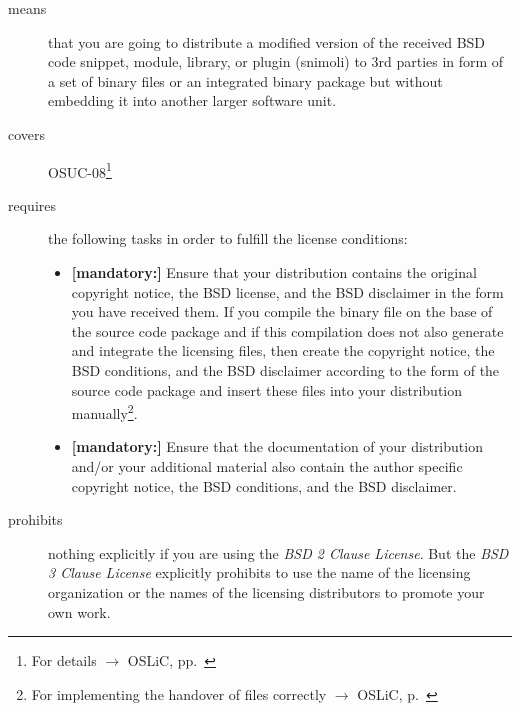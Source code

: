 \begin{description}
\item[means] that you are going to distribute a modified version of the received
BSD code snippet, module, library, or plugin (snimoli) to 3rd parties in form
of a set of binary files or an integrated binary package but without embedding
it into another larger software unit.
\item[covers] OSUC-08\footnote{For details $\rightarrow$ OSLiC, pp.\ \pageref{OSUC-08-DEF}}
\item[requires] the following tasks in order to fulfill the license conditions:
\begin{itemize}
   \item  \textbf{[mandatory:]} Ensure that your distribution contains the
  original copyright notice, the BSD license, and the BSD disclaimer in the form
  you have received them. If you compile the binary file on the base of the
  source code package and if this compilation does not also generate and
  integrate the licensing files, then create the copyright notice, the BSD
  conditions, and the BSD disclaimer according to the form of the source code
  package and insert these files into your distribution manually\footnote{For
  implementing the handover of files correctly $\rightarrow$ OSLiC, p.\ 
  \pageref{DistributingFilesHint}}.
  \item  \textbf{[mandatory:]} Ensure that the documentation of your
  distribution and/or your additional material also contain the author specific
  copyright notice, the BSD conditions, and the BSD disclaimer.
\end{itemize}

\item[prohibits] nothing explicitly if you are using the \emph{BSD 2 Clause
License}. But the \emph{BSD 3 Clause License} explicitly prohibits to use the
name of the licensing organization or the names of the licensing distributors to
promote your own work.

\end{description}

